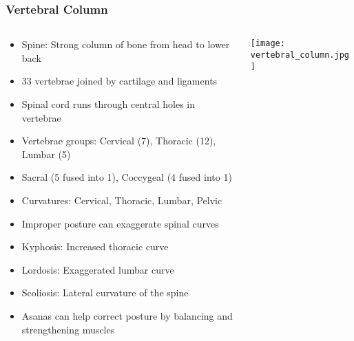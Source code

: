 \begin{frame}[fragile]\frametitle{Vertebral Column}
\begin{columns}
    \begin{column}[T]{0.5\linewidth}
      \begin{itemize}
		\item Spine: Strong column of bone from head to lower back
		\item 33 vertebrae joined by cartilage and ligaments
		\item Spinal cord runs through central holes in vertebrae
		\item Vertebrae groups: Cervical (7), Thoracic (12), Lumbar (5)
		\item Sacral (5 fused into 1), Coccygeal (4 fused into 1)
		\item Curvatures: Cervical, Thoracic, Lumbar, Pelvic
		\item Improper posture can exaggerate spinal curves
		\item Kyphosis: Increased thoracic curve
		\item Lordosis: Exaggerated lumbar curve
		\item Scoliosis: Lateral curvature of the spine
		\item Asanas can help correct posture by balancing and strengthening muscles
	  \end{itemize}
    \end{column}
    \begin{column}[T]{0.5\linewidth}
		\begin{center}
		\texttt{[image: vertebral\_column.jpg]} 
		\end{center}	
    \end{column}
  \end{columns}
\end{frame}

